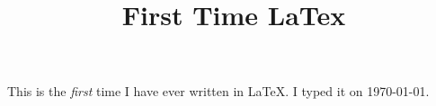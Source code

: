 \documentclass{article}
\title{First Time LaTex}
\begin{document}
This is the \emph{first} time I have ever written in \LaTeX. I typed it on \today.
\end{document}
